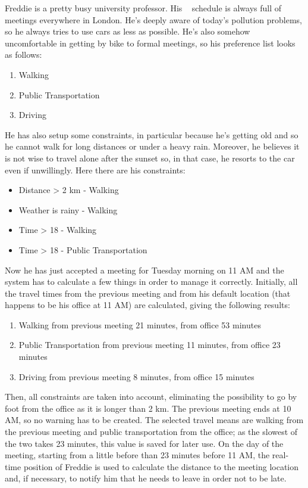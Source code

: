Freddie is a pretty busy university professor. His \projectname~ schedule is always full of meetings everywhere in London. He's deeply aware of today's pollution problems, so he always tries to use cars as less as possible. He's also somehow uncomfortable in getting by bike to formal meetings, so his preference list looks as follows:
\begin{enumerate}
\item Walking
\item Public Transportation
\item Driving
\end{enumerate}
He has also setup some constraints, in particular because he's getting old and so he cannot walk for long distances or under a heavy rain. Moreover, he believes it is not wise to travel alone after the sunset so, in that case, he resorts to the car even if unwillingly. Here there are his constraints:
\begin{itemize}
\item Distance > 2 km - Walking
\item Weather is rainy - Walking
\item Time > 18 - Walking
\item Time > 18 - Public Transportation
\end{itemize}
Now he has just accepted a meeting for Tuesday morning on 11 AM and the system has to calculate a few things in order to manage it correctly. Initially, all the travel times from the previous meeting and from his default location (that happens to be his office at 11 AM) are calculated, giving the following results:
\begin{enumerate}
\item Walking		from previous meeting 21 minutes, from office 53 minutes 
\item Public Transportation		from previous meeting 11 minutes, from office 23 minutes
\item Driving		from previous meeting 8 minutes, from office 15 minutes
\end{enumerate}
Then, all constraints are taken into account, eliminating the possibility to go by foot from the office as it is longer than 2 km. The previous meeting ends at 10 AM, so no warning has to be created. The selected travel means are walking from the previous meeting and public transportation from the office; as the slowest of the two takes 23 minutes, this value is saved for later use. On the day of the meeting, starting from a little before than 23 minutes before 11 AM, the real-time position of Freddie is used to calculate the distance to the meeting location and, if necessary, to notify him that he needs to leave in order not to be late.



